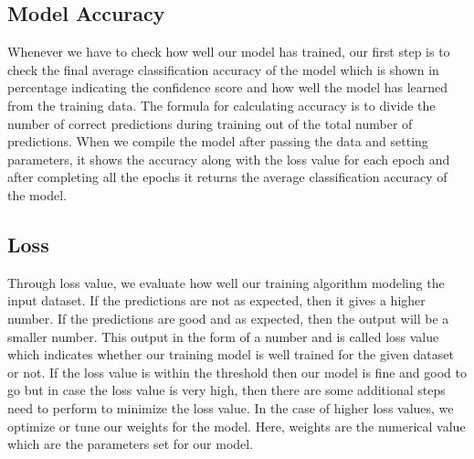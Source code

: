 \subsection{Model Accuracy}
Whenever we have to check how well our model has trained, our first step is to check the final average classification accuracy of the model which is shown in percentage indicating the confidence score and how well the model has learned from the training data. The formula for calculating accuracy is to divide the number of correct predictions during training out of the total number of predictions. When we compile the model after passing the data and setting parameters, it shows the accuracy along with the loss value for each epoch and after completing all the epochs it returns the average classification accuracy of the model.
\subsection{Loss}
Through loss value, we evaluate how well our training algorithm modeling the input dataset.  If the predictions are not as expected, then it gives a higher number. If the predictions are good and as expected, then the output will be a smaller number. This output in the form of a number and is called loss value which indicates whether our training model is well trained for the given dataset or not.  If the loss value is within the threshold then our model is fine and good to go but in case the loss value is very high, then there are some additional steps need to perform to minimize the loss value.  In the case of higher loss values, we optimize or tune our weights for the model. Here, weights are the numerical value which are the parameters set for our model.
